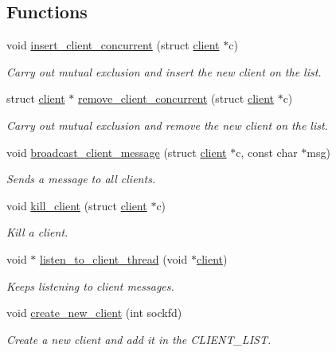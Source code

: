 \subsection*{Functions}
\begin{DoxyCompactItemize}
\item 
void \hyperlink{zip-zop-server_8c_a84f39912128d6dc7a66bbdd88fad00b5}{insert\+\_\+client\+\_\+concurrent} (struct \hyperlink{structclient}{client} $\ast$c)
\begin{DoxyCompactList}\small\item\em Carry out mutual exclusion and insert the new client on the list. \end{DoxyCompactList}\item 
struct \hyperlink{structclient}{client} $\ast$ \hyperlink{zip-zop-server_8c_a37f14ecc30cc2b45249b544fe70f2b6d}{remove\+\_\+client\+\_\+concurrent} (struct \hyperlink{structclient}{client} $\ast$c)
\begin{DoxyCompactList}\small\item\em Carry out mutual exclusion and remove the new client on the list. \end{DoxyCompactList}\item 
void \hyperlink{zip-zop-server_8c_a36e911ded647a0697ca152cae890bcf5}{broadcast\+\_\+client\+\_\+message} (struct \hyperlink{structclient}{client} $\ast$c, const char $\ast$msg)
\begin{DoxyCompactList}\small\item\em Sends a message to all clients. \end{DoxyCompactList}\item 
void \hyperlink{zip-zop-server_8c_ae5845d7e65c1c7407d1df63105450b5e}{kill\+\_\+client} (struct \hyperlink{structclient}{client} $\ast$c)
\begin{DoxyCompactList}\small\item\em Kill a client. \end{DoxyCompactList}\item 
void $\ast$ \hyperlink{zip-zop-server_8c_abb42bd69f5e5088fef8519780a977f98}{listen\+\_\+to\+\_\+client\+\_\+thread} (void $\ast$\hyperlink{structclient}{client})
\begin{DoxyCompactList}\small\item\em Keeps listening to client messages. \end{DoxyCompactList}\item 
void \hyperlink{zip-zop-server_8c_ab9a14cd690eac9781dd224e034fbd01d}{create\+\_\+new\+\_\+client} (int sockfd)
\begin{DoxyCompactList}\small\item\em Create a new client and add it in the {\ttfamily C\+L\+I\+E\+N\+T\+\_\+\+L\+I\+ST}. \end{DoxyCompactList}\item 

\end{DoxyCompactItemize}
